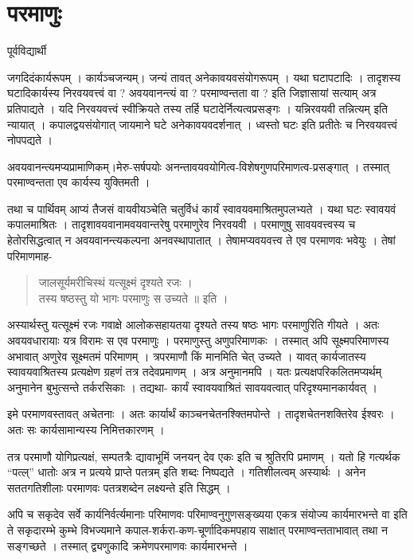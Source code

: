 \chapter{परमाणुः}

\begin{center}
\smallskip
पूर्वविद्यार्थी
\addrule
\end{center}
जगदिदंकार्यरूपम् । कार्यञ्चजन्यम्। जन्यं तावत् अनेकावयवसंयोगरूपम् । यथा घटापटादिः । तादृशस्य घटादिकार्यस्य निरवयवत्त्वं वा ? अवयवानन्त्यं वा ? परमाण्वन्तता वा ? इति जिज्ञासायां सत्याम् अत्र प्रतिपाद्यते । यदि निरवयवत्त्वं स्वीक्रियते तस्य तर्हि घटादेर्नित्यत्वप्रसङ्गः । यन्निरवयवी तन्नित्यम् इति न्यायात् । कपालद्वयसंयोगात् जायमाने घटे अनेकावयवदर्शनात् । ध्वस्तो घटः इति प्रतीतेः च निरवयवत्त्वं नोपपद्यते ।

अवयवानन्त्यमप्यप्रामाणिकम्।मेरु-सर्षपयोः अनन्तावयवयोगित्व-विशेषगुणपरिमाणत्व-प्रसङ्गात् । तस्मात् परमाण्वन्तता एव कार्यस्य युक्तिमती ।

तथा च पार्थिवम् आप्यं तैजसं वायवीयञ्चेति चतुर्विधं कार्यं स्वावयवमाश्रितमुपलभ्यते । यथा घटः स्वावयवं कपालमाश्रितः । तादृशावयवानामवयवान्तरेषु परमाणुरेव निरवयवी । परमाणुषु सावयवत्त्वस्य च हेतोरसिद्धत्वात् न अवयवानन्त्यकल्पना अनवस्थापातात् । तेषामप्यवयवत्त्व ते एव परमाणवः भवेयुः । तेषां परिमाणमाह-
\begin{verse}
जालसूर्यमरीचिस्थं यत्सूक्ष्मं दृश्यते रजः ।\\
तस्य षष्ठस्तु यो भागः परमाणुः स उच्यते ॥ इति ।
\end{verse}
अस्यार्थस्तु यत्सूक्ष्मं रजः गवाक्षे आलोकसहायतया दृश्यते तस्य षष्ठः भागः परमाणुरिति गीयते । अतः अवयवधारायाः यत्र विरामः स एव परमाणुः । परमाणुस्तु अणुपरिमाणकः । तस्मात् अपि सूक्ष्मपरिमाणस्य अभावात् अणुरेव सूक्ष्मतमं परिमाणम् । त्रपरमाणौ किं मानमिति चेत् उच्यते । यावत् कार्यजातस्य स्वावयवाश्रितस्य प्रत्यक्षेण ग्रहणं तत्र तदेवप्रमाणम् । अत्र अनुमानमपि । यतः प्रत्यक्षपरिकलितमप्यर्थम् अनुमानेन बुभुत्सन्ते तर्करसिकाः । तद्यथा- कार्यं स्वावयवाश्रितं सावयवत्वात् परिदृश्यमानकार्यवत् ।

इमे परमाणवस्तावत् अचेतनाः । अतः कार्यार्थं काञ्चनचेतनश्क्तिमपोन्ते । तादृशचेतनशक्तिरेव ईश्वरः । अतः सः कार्यसामान्यस्य निमित्तकारणम् ।

तत्र परमाणौ योगिप्रत्यक्षं, सम्पतत्रैः द्यावाभूमिं जनयन् देव एकः इति च श्रुतिरपि प्रमाणम् । यतो हि गत्यर्थक “पत्ल्” धातोः अत्र न प्रत्यये प्राप्ते पतत्रम् इति शब्दः निष्पद्यते । गतिशीलत्वम् अस्यार्थः । अनेन सततगतिशीलाः परमाणवः पतत्रशब्देन लक्ष्यन्ते इति सिद्धम् ।

अपि च सकृदेव सर्वे कार्यनिर्वर्त्यमानाः परिमाणवः परिमाण्वनुगुणसङ्ख्यया एकत्र संयोज्य कार्यमारभन्ते वा इति ते सकृदारम्भे कुम्भे विभज्यमाने कपाल-शर्करा-कण-चूर्णादिकमपहाय साक्षात् परमाण्वन्तताभावात् तथा न सङ्गच्छते । तस्मात् द्व्यणुकादि क्रमेणपरमाणवः कार्यमारभन्ते । 

